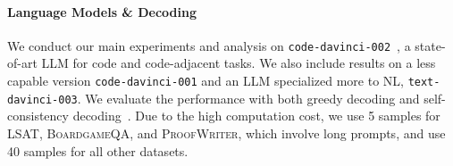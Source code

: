 \documentclass{article}
\theoremstyle{definition}
\newcommand\ttsmall[1]{\texttt{\small #1}}
\newcommand{\lsat}{\textsc{LSAT}}
\newcommand{\clutrr}{\textsc{Clutrr}}
\newcommand{\proofwriter}{\textsc{ProofWriter}}
\newcommand{\boardgame}{\textsc{BoardgameQA}}
\newcommand{\satlm}{\textsc{SatLM}}
\newcommand{\pallm}{\textsc{ProgLM}}
\begin{document}
  
\paragraph{Language Models \& Decoding}
We conduct our main experiments and analysis on \ttsmall{code-davinci-002}~\citep{codex}, a state-of-art LLM for code and code-adjacent tasks. We also include results on a less capable version \ttsmall{code-davinci-001} and an LLM specialized more to NL, \ttsmall{text-davinci-003}. We evaluate the performance with both greedy decoding and self-consistency decoding~\citep{selfcons}.
Due to the high computation cost, we use 5 samples for \lsat{}, \boardgame{}, and \proofwriter{}, which involve long prompts, and use 40 samples for all other datasets.

\end{document}

